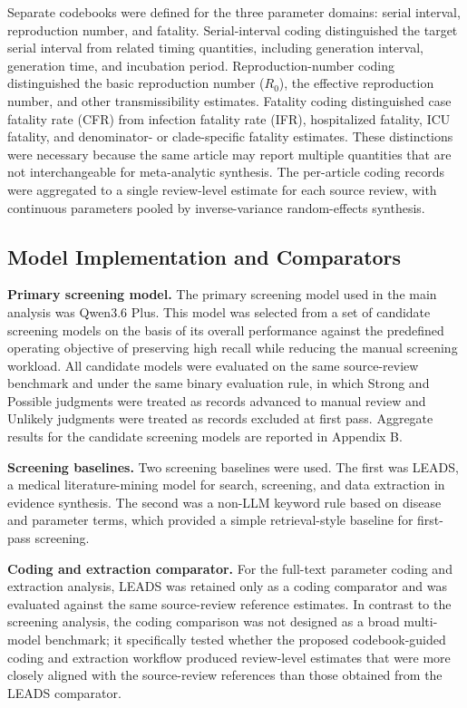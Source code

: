 Separate codebooks were defined for the three parameter domains: serial interval, reproduction number, and fatality. Serial-interval coding distinguished the target serial interval from related timing quantities, including generation interval, generation time, and incubation period. Reproduction-number coding distinguished the basic reproduction number ($R_0$), the effective reproduction number, and other transmissibility estimates. Fatality coding distinguished case fatality rate (CFR) from infection fatality rate (IFR), hospitalized fatality, ICU fatality, and denominator- or clade-specific fatality estimates. These distinctions were necessary because the same article may report multiple quantities that are not interchangeable for meta-analytic synthesis. The per-article coding records were aggregated to a single review-level estimate for each source review, with continuous parameters pooled by inverse-variance random-effects synthesis.

\subsection{Model Implementation and Comparators}

\textbf{Primary screening model.}
The primary screening model used in the main analysis was Qwen3.6 Plus. This model was selected from a set of candidate screening models on the basis of its overall performance against the predefined operating objective of preserving high recall while reducing the manual screening workload. All candidate models were evaluated on the same source-review benchmark and under the same binary evaluation rule, in which Strong and Possible judgments were treated as records advanced to manual review and Unlikely judgments were treated as records excluded at first pass. Aggregate results for the candidate screening models are reported in Appendix B.

\textbf{Screening baselines.}
Two screening baselines were used. The first was LEADS, a medical literature-mining model for search, screening, and data extraction in evidence synthesis.\cite{ref7} The second was a non-LLM keyword rule based on disease and parameter terms, which provided a simple retrieval-style baseline for first-pass screening.

\textbf{Coding and extraction comparator.}
For the full-text parameter coding and extraction analysis, LEADS was retained only as a coding comparator and was evaluated against the same source-review reference estimates. In contrast to the screening analysis, the coding comparison was not designed as a broad multi-model benchmark; it specifically tested whether the proposed codebook-guided coding and extraction workflow produced review-level estimates that were more closely aligned with the source-review references than those obtained from the LEADS comparator.

